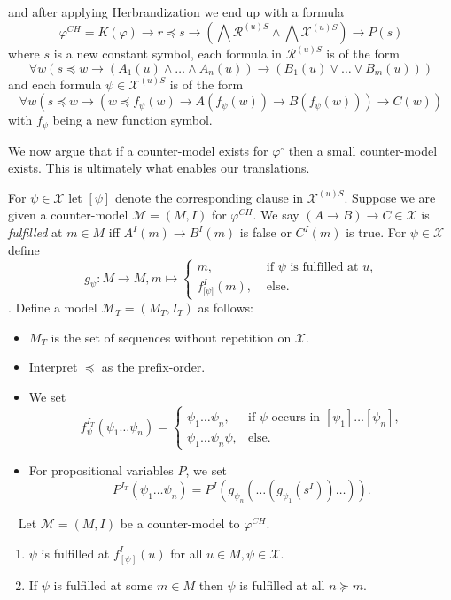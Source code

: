 \documentclass[runningheads]{llncs}
\begin{document}
and after applying Herbrandization we end up with a formula $$\varphi^{CH} = K(\varphi)\to r\preceq s\to\left(\bigwedge\mathcal R^{(u)S}\wedge \bigwedge\mathcal X^{(u)S}\right)\to P(s)$$ where $s$ is a new constant symbol, each formula in $\mathcal R^{(u)S}$ is of the form
$$\forall w(s\preceq w\to (A_1(u)\wedge\dots\wedge A_n(u))\to(B_1(u)\vee\dots\vee B_m(u)))$$
and each formula $\psi\in\mathcal X^{(u)S}$ is of the form
$$\forall w(s\preceq w\to(w\preceq f_\psi(w)\to A(f_\psi(w))\to B(f_\psi(w)))\to C(w))$$
with $f_\psi$ being a new function symbol.

We now argue that if a counter-model exists for $\varphi^\circ$ then a small counter-model exists. This is ultimately what enables our translations.

\begin{definition}
For $\psi\in\mathcal X$ let $[\psi]$ denote the corresponding clause in $\mathcal X^{(u)S}$. Suppose we are given a counter-model $\mathcal M = (M, I)$ for $\varphi^{CH}$.
We say $(A\to B)\to C\in\mathcal X$ is \emph{fulfilled} at $m\in M$ iff $A^I(m)\to B^I(m)$ is false or $C^I(m)$ is true. For $\psi\in\mathcal X$ define $$g_\psi : M\to M, m\mapsto\begin{cases}
		m,&\text{ if $\psi$ is fulfilled at $u$,}\\
		f^I_{\lbrack\psi\rbrack}(m),&\text{ else.}		
	\end{cases}$$. Define a model $\mathcal M_T = (M_T, I_T)$ as follows:
	\begin{itemize}
		\item $M_T$ is the set of sequences without repetition on $\mathcal X$.
		\item Interpret $\preceq$ as the prefix-order.
		\item We set $$f_\psi^{I_T}(\psi_1\dots\psi_n) = \begin{cases}
			\psi_1\dots\psi_n, &\text{if $\psi$ occurs in $[\psi_1]\dots[\psi_n]$,}\\
			\psi_1\dots\psi_n\psi, &\text{else.}			
		\end{cases}$$
		\item For propositional variables $P$, we set $$P^{I_T}\left(\psi_1\dots \psi_n\right) = P^I\left(g_{\psi_n}\left(\dots\left(g_{\psi_1}\left(s^I\right)\right)\dots\right)\right).$$
	\end{itemize}
\end{definition}
\begin{lemma}~\label{thm:prop-countermodel-reduction}
	Let $\mathcal M = (M, I)$ be a counter-model to $\mathcal \varphi^{CH}$.
	\begin{enumerate}
		\item $\psi$ is fulfilled at $f_{[\psi]}^I(u)$ for all $u\in M, \psi\in\mathcal X$.
		\item If $\psi$ is fulfilled at some $m\in M$ then $\psi$ is fulfilled at all $n\succeq m$.
	\end{enumerate}
\end{lemma}
\end{document}
